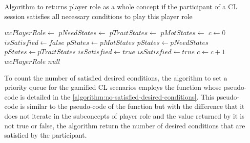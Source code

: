 \begin{algoritmo}
\caption{Algorithm to returns player role  as a whole concept if the participant  of a CL session  satisfies all necessary conditions to play this player role}
\label{algorithm:satisfy-necessary-conditions}
\begin{algorithmic}[1]\small
{}
  \State $wcPlayerRole \gets$ 
  \State $pNeedStates \gets$ 
  \State $pTraitStates \gets$ 
  \State $pMotStates \gets$   
    \State $c \gets 0$
      \State $isSatisfied \gets false$
         $pStates \gets pMotStates$
        \EndIf
         $pStates \gets pNeedStates$
        \EndIf
         $pStates \gets pTraitStates$
        \EndIf
         $isSatisfied \gets true$
        \Else
             $isSatisfied \gets true$
            \EndIf
          \EndFor
        \EndIf
      \EndFor
       $c \gets c+1$
      \EndIf
    \EndFor
      \State \Return $wcPlayerRole$
    \EndIf
  \EndFor
  \State \Return $null$
\EndFunction
\end{algorithmic}
\end{algoritmo}

To count the number of satisfied desired conditions, the algorithm to set a priority queue for the gamified CL scenarios employs the function  whose pseudo-code is detailed in the \autoref{algorithm:no-satisfied-desired-conditions}. This pseudo-code is similar to the pseudo-code of the function  but with the difference that it does not iterate in the subconcepts of player role and the value returned by it is not true or false, the algorithm return the number of desired conditions that are satisfied by the participant.


